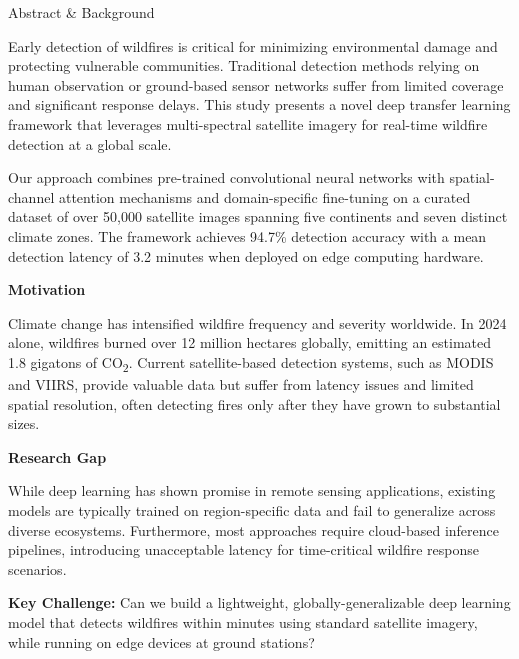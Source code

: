 \documentclass[10pt]{article}
\newlength{\panelwidth}
\newcommand{\paneltitle}[1]{%
  \begin{panelhead}%
    #1%
  \end{panelhead}%
}
\newcommand{\subheading}[1]{%
  \medskip
  {\color{secondary}\bfseries\small #1}
  \smallskip
}
\newcommand{\tinysep}{\vspace{3pt}}
\newcommand{\smallsep}{\vspace{6pt}}
\begin{document}
\begin{minipage}[t]{\panelwidth}
  \RaggedRight

  \paneltitle{\faFile\hspace{4pt}Abstract \& Background}

  \smallsep

  {\footnotesize\color{darktext}
  Early detection of wildfires is critical for minimizing
  environmental damage and protecting vulnerable communities.
  Traditional detection methods relying on human observation or
  ground-based sensor networks suffer from limited coverage and
  significant response delays. This study presents a novel deep
  transfer learning framework that leverages multi-spectral
  satellite imagery for real-time wildfire detection at a
  global scale.}

  \tinysep

  {\footnotesize\color{darktext}
  Our approach combines pre-trained convolutional neural
  networks with spatial-channel attention mechanisms and
  domain-specific fine-tuning on a curated dataset of over
  50,000 satellite images spanning five continents and seven
  distinct climate zones. The framework achieves 94.7\%
  detection accuracy with a mean detection latency of
  3.2 minutes when deployed on edge computing hardware.}

  \smallsep

  \subheading{Motivation}

  {\footnotesize\color{darktext}
  Climate change has intensified wildfire frequency and
  severity worldwide. In 2024 alone, wildfires burned over
  12 million hectares globally, emitting an estimated
  1.8 gigatons of CO\textsubscript{2}. Current satellite-based
  detection systems, such as MODIS and VIIRS, provide valuable
  data but suffer from latency issues and limited spatial
  resolution, often detecting fires only after they have
  grown to substantial sizes.}

  \smallsep

  \subheading{Research Gap}

  {\footnotesize\color{darktext}
  While deep learning has shown promise in remote sensing
  applications, existing models are typically trained on
  region-specific data and fail to generalize across diverse
  ecosystems. Furthermore, most approaches require cloud-based
  inference pipelines, introducing unacceptable latency for
  time-critical wildfire response scenarios.}

  \smallsep

  \begin{highlightbox}
    {\footnotesize\bfseries\color{primary}Key Challenge:}
    {\footnotesize\color{darktext} Can we build a lightweight,
    globally-generalizable deep learning model that detects
    wildfires within minutes using standard satellite imagery,
    while running on edge devices at ground stations?}
  \end{highlightbox}

\end{minipage}%
\end{document}
